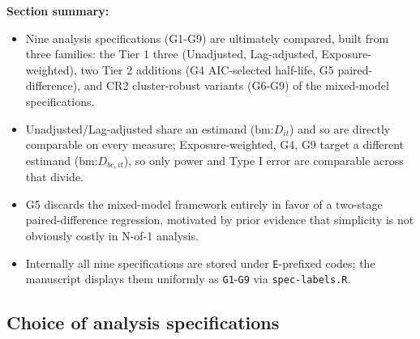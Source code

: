 \documentclass[
  11pt,
]{article}
\providecommand{\tightlist}{%
  \setlength{\itemsep}{0pt}\setlength{\parskip}{0pt}}
\begin{document}
\textbf{Section summary:}

\begin{itemize}
\tightlist
\item
  Nine analysis specifications (G1-G9) are ultimately compared, built
  from three families: the Tier 1 three (Unadjusted, Lag-adjusted,
  Exposure-weighted), two Tier 2 additions (G4 AIC-selected half-life,
  G5 paired-difference), and CR2 cluster-robust variants (G6-G9) of
  the mixed-model specifications.
\item
  Unadjusted/Lag-adjusted share an estimand (\(\text{bm:}D_{it}\)) and
  so are directly comparable on every measure; Exposure-weighted,
  G4, G9 target a different estimand (\(\text{bm:}D_{bc,it}\)), so only
  power and Type I error are comparable across that divide.
\item
  G5 discards the mixed-model framework entirely in favor of a
  two-stage paired-difference regression, motivated by prior evidence
  that simplicity is not obviously costly in N-of-1 analysis.
\item
  Internally all nine specifications are stored under \texttt{E}-prefixed
  codes; the manuscript displays them uniformly as \texttt{G1}-\texttt{G9} via
  \texttt{spec-labels.R}.
\end{itemize}

\subsection{Choice of analysis specifications}\label{choice-of-analysis-specifications}
\end{document}
